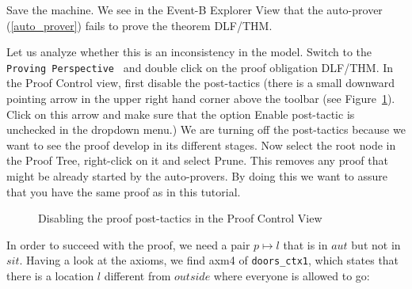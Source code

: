 Save the machine. We see in the \textsf{Event-B Explorer View} that the auto-prover (\ref{auto_prover}) fails to prove the theorem \textsf{DLF/THM}.


Let us analyze whether this is an inconsistency in the model. Switch to the \texttt{Proving Perspective } and double click on the proof obligation \textsf{DLF/THM}.
In the Proof Control view, first disable the post-tactics (there is a small downward pointing arrow in the upper right hand corner above the toolbar (see Figure~\ref{fig_tut_10_post_tactics}).
Click on this arrow and make sure that the option \textsf{Enable post-tactic} is unchecked in the dropdown menu.)
We are turning off the post-tactics because we want to see the proof develop in its different stages.
Now select the root node in the \textsf{Proof Tree}, right-click on it and select \textsf{Prune}.
This removes any proof that might be already started by the auto-provers.
By doing this we want to assure that you have the same proof as in this tutorial.

\begin{figure}[!ht]
  \begin{center}
    \caption{Disabling the proof post-tactics in the Proof Control View}
    \label{fig_tut_10_post_tactics}
  \end{center}
\end{figure}

In order to succeed with the proof, we need a pair $p \mapsto l$ that is in $aut$ but not in $sit$.
Having a look at the axioms, we find  \textsf{axm4} of \texttt{doors\_ctx1}, which states that
  there is a location $l$ different from $outside$ where everyone is allowed to go:


